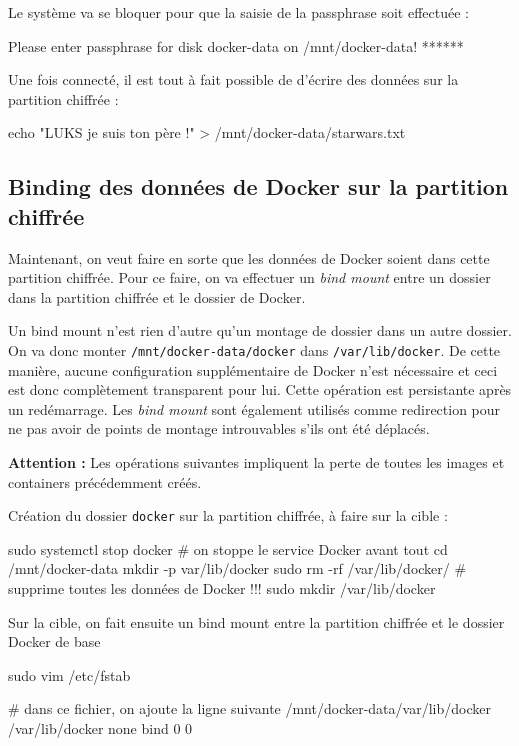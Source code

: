 \documentclass[11pt,a4paper,oneside]{report}
\newcommand{\code}[1]{\texttt{#1}}
\begin{document}
Le système va se bloquer pour que la saisie de la passphrase soit effectuée :
\begin{bashcode}
Please enter passphrase for disk docker-data on /mnt/docker-data! ******
\end{bashcode}

Une fois connecté, il est tout à fait possible de d'écrire des données sur la partition chiffrée :
\begin{bashcode}
echo "LUKS je suis ton père !" > /mnt/docker-data/starwars.txt
\end{bashcode}


\subsection{Binding des données de Docker sur la partition chiffrée}
Maintenant, on veut faire en sorte que les données de Docker soient dans cette partition chiffrée. Pour ce faire, on va effectuer un \textit{bind mount} entre un dossier dans la partition chiffrée et le dossier de Docker.

Un bind mount n'est rien d'autre qu'un montage de dossier dans un autre dossier. On va donc monter \code{/mnt/docker-data/docker} dans \code{/var/lib/docker}. De cette manière, aucune configuration supplémentaire de Docker n'est nécessaire et ceci est donc complètement transparent pour lui. Cette opération est persistante après un redémarrage. Les \textit{bind mount} sont également utilisés comme redirection pour ne pas avoir de points de montage introuvables s'ils ont été déplacés.

\textbf{Attention : } Les opérations suivantes impliquent la perte de toutes les images et containers précédemment créés.

Création du dossier \code{docker} sur la partition chiffrée, à faire sur la cible :
\begin{bashcode}
sudo systemctl stop docker # on stoppe le service Docker avant tout
cd /mnt/docker-data
mkdir -p var/lib/docker
sudo rm -rf /var/lib/docker/ # supprime toutes les données de Docker !!!
sudo mkdir /var/lib/docker
\end{bashcode}

Sur la cible, on fait ensuite un bind mount entre la partition chiffrée et le dossier Docker de base

\begin{bashcode}
sudo vim /etc/fstab

# dans ce fichier, on ajoute la ligne suivante
/mnt/docker-data/var/lib/docker /var/lib/docker none bind 0 0
\end{bashcode}
\end{document}
